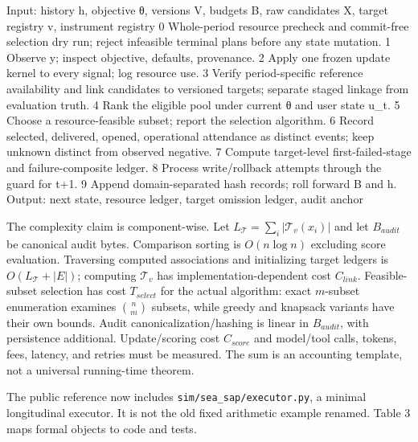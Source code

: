 \documentclass[
  11pt]{article}
\newenvironment{Shaded}{}{}
\newcommand{\NormalTok}[1]{#1}
\begin{document}
\begin{Shaded}
\begin{Highlighting}[]
\NormalTok{Input: history h, objective θ, versions V, budgets B,}
\NormalTok{       raw candidates X, target registry v, instrument registry}
\NormalTok{ 0  Whole{-}period resource precheck and commit{-}free selection dry run;}
\NormalTok{    reject infeasible terminal plans before any state mutation.}
\NormalTok{ 1  Observe y; inspect objective, defaults, provenance.}
\NormalTok{ 2  Apply one frozen update kernel to every signal; log resource use.}
\NormalTok{ 3  Verify period{-}specific reference availability and link candidates}
\NormalTok{    to versioned targets; separate staged linkage from evaluation truth.}
\NormalTok{ 4  Rank the eligible pool under current θ and user state u\_t.}
\NormalTok{ 5  Choose a resource{-}feasible subset; report the selection algorithm.}
\NormalTok{ 6  Record selected, delivered, opened, operational attendance as}
\NormalTok{    distinct events; keep unknown distinct from observed negative.}
\NormalTok{ 7  Compute target{-}level first{-}failed{-}stage and failure{-}composite ledger.}
\NormalTok{ 8  Process write/rollback attempts through the guard for t+1.}
\NormalTok{ 9  Append domain{-}separated hash records; roll forward B and h.}
\NormalTok{Output: next state, resource ledger, target omission ledger, audit anchor}
\end{Highlighting}
\end{Shaded}

The complexity claim is component-wise. Let
\(L_{\mathcal T}=\sum_i|\mathcal T_v(x_i)|\) and let \(B_{audit}\) be
canonical audit bytes. Comparison sorting is \(O(n\log n)\) excluding
score evaluation. Traversing computed associations and initializing
target ledgers is \(O(L_{\mathcal T}+|E|)\); computing \(\mathcal T_v\)
has implementation-dependent cost \(C_{link}\). Feasible-subset
selection has cost \(T_{select}\) for the actual algorithm: exact
\(m\)-subset enumeration examines \(\binom nm\) subsets, while greedy
and knapsack variants have their own bounds. Audit
canonicalization/hashing is linear in \(B_{audit}\), with persistence
additional. Update/scoring cost \(C_{score}\) and model/tool calls,
tokens, fees, latency, and retries must be measured. The sum is an
accounting template, not a universal running-time theorem.

The public reference now includes \texttt{sim/sea\_sap/executor.py}, a
minimal longitudinal executor. It is not the old fixed arithmetic
example renamed. Table 3 maps formal objects to code and tests.
\end{document}
